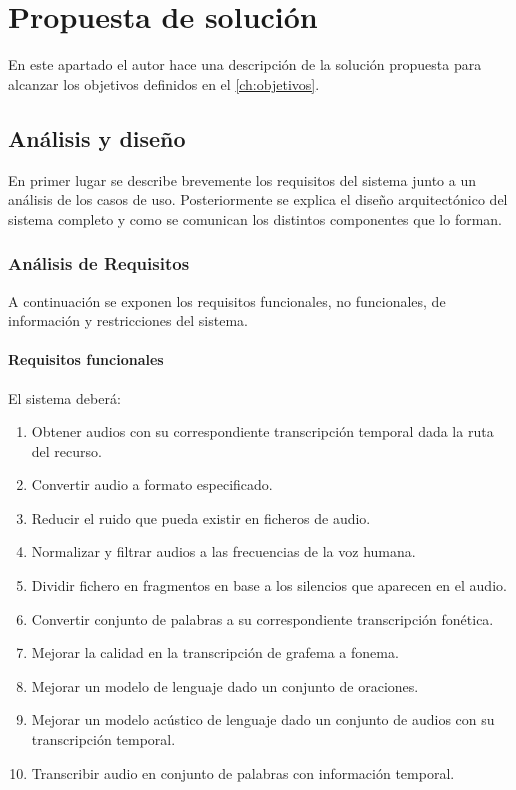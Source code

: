 \documentclass[../main.tex]{subfiles}
\begin{document}
\chapter{Propuesta de solución}\label{ch:propuesta_solucion}
En este apartado el autor hace una descripción de la solución propuesta para alcanzar los objetivos definidos en el \autoref{ch:objetivos}.

\section{Análisis y diseño}\label{sec:analisis_diseno}
En primer lugar se describe brevemente los requisitos del sistema junto a un análisis de los casos de uso. Posteriormente se explica el diseño arquitectónico del sistema completo y como se comunican los distintos componentes que lo forman.

\subsection{Análisis de Requisitos}\label{subsec:analisis_requisitos}
A continuación se exponen los requisitos funcionales, no funcionales, de información y restricciones del sistema.

\subsubsection{Requisitos funcionales}\label{subsubsec:req_funcionales}
El sistema deberá:

\begin{enumerate}
    \item Obtener audios con su correspondiente transcripción temporal dada la ruta del recurso.
    \item Convertir audio a formato especificado.
    \item Reducir el ruido que pueda existir en ficheros de audio.
    \item Normalizar y filtrar audios a las frecuencias de la voz humana.
    \item Dividir fichero en fragmentos en base a los silencios que aparecen en el audio.
    \item Convertir conjunto de palabras a su correspondiente transcripción fonética.
    \item Mejorar la calidad en la transcripción de grafema a fonema.
    \item Mejorar un modelo de lenguaje dado un conjunto de oraciones.
    \item Mejorar un modelo acústico de lenguaje dado un conjunto de audios con su transcripción temporal.
    \item Transcribir audio en conjunto de palabras con información temporal.
\end{enumerate}
\end{document}
